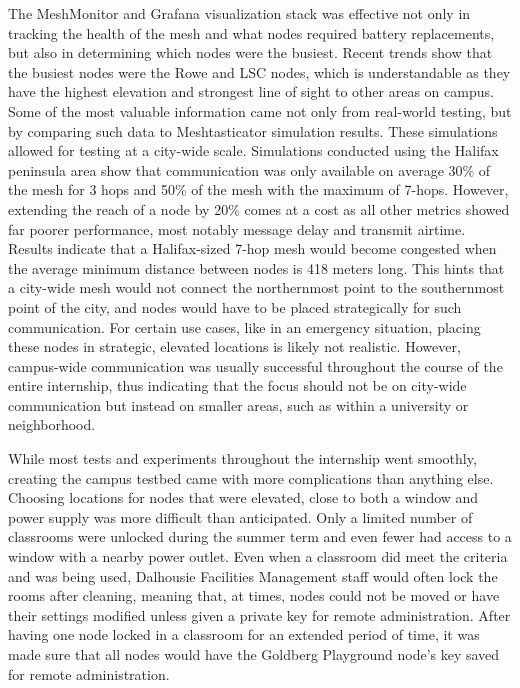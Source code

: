 \documentclass[11pt]{article}
\begin{document}
The MeshMonitor and Grafana visualization stack was effective not only in tracking the health of the mesh and what nodes required battery replacements, but also in determining which nodes were the busiest. Recent trends show that the busiest nodes were the Rowe and LSC nodes, which is understandable as they have the highest elevation and strongest line of sight to other areas on campus. Some of the most valuable information came not only from real-world testing, but by comparing such data to Meshtasticator simulation results. These simulations allowed for testing at a city-wide scale. Simulations conducted using the Halifax peninsula area show that communication was only available on average 30\% of the mesh for 3 hops and 50\% of the mesh with the maximum of 7-hops. However, extending the reach of a node by 20\% comes at a cost as all other metrics showed far poorer performance, most notably message delay and transmit airtime. Results indicate that a Halifax-sized 7-hop mesh would become congested when the average minimum distance between nodes is 418 meters long. This hints that a city-wide mesh would not connect the northernmost point to the southernmost point of the city, and nodes would have to be placed strategically for such communication. For certain use cases, like in an emergency situation, placing these nodes in strategic, elevated locations is likely not realistic. However, campus-wide communication was usually successful throughout the course of the entire internship, thus indicating that the focus should not be on city-wide communication but instead on smaller areas, such as within a university or neighborhood.

While most tests and experiments throughout the internship went smoothly, creating the campus testbed came with more complications than anything else. Choosing locations for nodes that were elevated, close to both a window and power supply was more difficult than anticipated. Only a limited number of classrooms were unlocked during the summer term and even fewer had access to a window with a nearby power outlet. Even when a classroom did meet the criteria and was being used, Dalhousie Facilities Management staff would often lock the rooms after cleaning, meaning that, at times, nodes could not be moved or have their settings modified unless given a private key for remote administration. After having one node locked in a classroom for an extended period of time, it was made sure that all nodes would have the Goldberg Playground node’s key saved for remote administration. 
\end{document}
